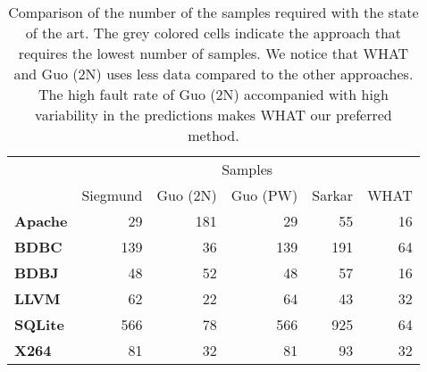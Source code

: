 \begin{table}[t]
\caption{Comparison of the number of the samples
required with the state of the art. The grey colored cells indicate the approach that requires the lowest number of samples.  We notice that WHAT and Guo (2N) uses less data compared to the other approaches. The high fault rate  of Guo (2N) accompanied with high variability in the predictions makes WHAT our preferred method.}\label{tab:measurements}
\vspace{2ex}
\centering
\small
\begin{tabular}{lrrrrr}
\toprule
                                   & \multicolumn{5}{c}{{Samples}}                                                                         \\ \cmidrule{2-6} 
\multirow{-2}{*}{\textbf{}} & {Siegmund} & {Guo (2N)}          & {Guo (PW)} & {Sarkar} & {WHAT}                \\ \midrule
\textbf{Apache}                    & 29                & 181                        & 29                & 55              & \cellcolor[HTML]{C0C0C0}16 \\ 
\textbf{BDBC}                      & 139               & \cellcolor[HTML]{C0C0C0}36 & 139               & 191             & 64                         \\ 
\textbf{BDBJ}                      & 48                & 52                         & 48                & 57              & \cellcolor[HTML]{C0C0C0}16 \\ 
\textbf{LLVM}                      & 62                & \cellcolor[HTML]{C0C0C0}22 & 64                & 43              & 32                         \\ 
\textbf{SQLite}                    & 566               & 78                         & 566               & 925             & \cellcolor[HTML]{C0C0C0}64 \\ 
\textbf{X264}                      & 81                & \cellcolor[HTML]{C0C0C0}32 & 81                & 93              & \cellcolor[HTML]{C0C0C0}32 \\ \bottomrule
\end{tabular}
\end{table}